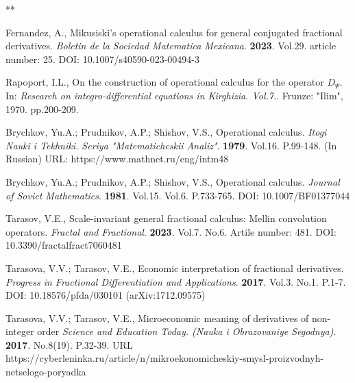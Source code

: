 \documentclass[12pt]{article}
\begin{document}
\begin{thebibliography}{**}


 Fernandez, A., 
Mikusiski's operational calculus for general conjugated fractional derivatives.
\textit{Boletin de la Sociedad Matematica Mexicana}. 
\textbf{2023}. Vol.29. article number: 25. 
DOI: 10.1007/s40590-023-00494-3

 Rapoport, I.L., 
On the construction of operational calculus for the operator $D_{\Psi}$. 
In: \textit{Research on integro-differential equations in Kirghizia. Vol.7.}. 
Frunze: "Ilim", 1970. pp.200-209.

 Brychkov, Yu.A.; Prudnikov, A.P.; Shishov, V.S., 
Operational calculus. 
\textit{Itogi Nauki i Tekhniki. Seriya "Matematicheskii Analiz"}. 
\textbf{1979}. Vol.16. P.99-148. (In Russian)
URL: https://www.mathnet.ru/eng/intm48 

 Brychkov, Yu.A.; Prudnikov, A.P.; Shishov, V.S., 
Operational calculus. 
\textit{Journal of Soviet Mathematics}. 
\textbf{1981}. Vol.15. Vol.6. P.733-765. 
DOI: 10.1007/BF01377044


 Tarasov, V.E.,
Scale-invariant general fractional calculus: Mellin convolution operators. 
\textit{Fractal and Fractional}. 
\textbf{2023}. Vol.7. No.6. Artile number: 481. 
DOI: 10.3390/fractalfract7060481


 Tarasova, V.V.; Tarasov, V.E., 
Economic interpretation of fractional derivatives.
\textit{Progress in Fractional Differentiation and Applications}.
\textbf{2017}. Vol.3. No.1. P.1-7.
DOI: 10.18576/pfda/030101
(arXiv:1712.09575)

 Tarasova, V.V.; Tarasov, V.E.,
Microeconomic meaning of derivatives of non-integer order
\textit{Science and Education Today. (Nauka i Obrazovaniye Segodnya)}.
\textbf{2017}. No.8(19). P.32-39. 
URL https://cyberleninka.ru/article/n/mikroekonomicheskiy-smysl-proizvodnyh-netselogo-poryadka


\end{thebibliography}
\end{document}
